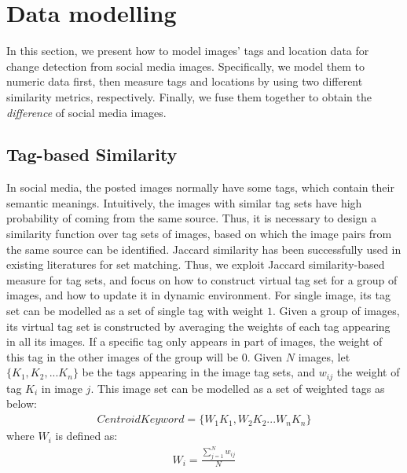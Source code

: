 \documentclass[runningheads,a4paper]{llncs}
\begin{document}
\section{Data modelling} \label{sec-datamodelling}

In this section, we present how to model images' tags and location data for change detection from social media images. 
Specifically, we model them to numeric data first, then measure tags and locations by using two different similarity metrics, respectively. Finally, we fuse them together to obtain the \emph{difference} of social media images.

\subsection{Tag-based Similarity}

In social media, the posted images normally have some tags, 
which contain their semantic meanings. 
Intuitively, the images with similar tag sets have high probability of coming from the same source. 
Thus, it is necessary to design a similarity function over tag sets of images, 
based on which the image pairs from the same source can be identified. 
Jaccard similarity has been successfully used in existing literatures for set matching. 
Thus, we exploit Jaccard similarity-based measure for tag sets, 
and focus on how to construct virtual tag set for a group of images, 
and how to update it in dynamic environment. 
For single image, its tag set can be modelled as a set of single tag with weight $1$. 
Given a group of images, its virtual tag set is constructed by averaging the weights of each tag appearing in all its images. 
If a specific tag only appears in part of images, the weight of this tag in the other images of the group will be $0$. 
Given $N$ images, let $\{K_1, K_2,...K_n\}$ be the tags appearing in the image tag sets, and $w_{ij}$ the weight of tag $K_i$ in image $j$. This image set can be modelled as a set of weighted tags as below:
\begin{eqnarray}\label{equ:Centroid}
CentroidKeyword = \{W_1 K_1,W_2 K_2 ...W_n K_n\}
\end{eqnarray}
\noindent where $W_i$ is defined as:
\begin{eqnarray}
W_i = \frac{\sum_{j=1}^N w_{ij}}{N}
\end{eqnarray}
\end{document}
